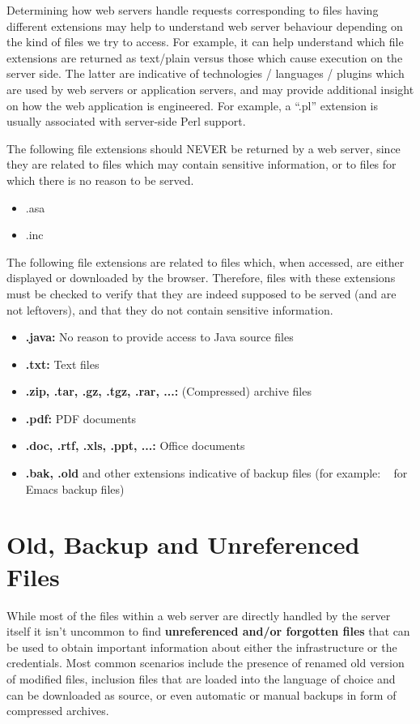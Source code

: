 	Determining how web servers handle requests corresponding to files having different extensions 
	may help to understand web server behaviour depending on the kind of files we try to access. 
	For example, it can help understand which file extensions are returned as text/plain versus 
	those which cause execution on the server side. The latter are indicative of technologies / 
	languages / plugins which are used by web servers or application servers, and may provide 
	additional insight on how the web application is engineered. For example, a “.pl” extension 
	is usually associated with server-side Perl support.

	The following file extensions should NEVER be returned by a web server, since they are related 
	to files which may contain sensitive information, or to files for which there is no reason to 
	be served.
		\begin{itemize}
			\item .asa
			\item .inc
		\end{itemize}

	The following file extensions are related to files which, when accessed, are either displayed 
	or downloaded by the browser. Therefore, files with these extensions must be checked to verify 
	that they are indeed supposed to be served (and are not leftovers), and that they do not contain
	sensitive information.
		\begin{itemize}
			\item {\bf .java:} No reason to provide access to Java source files
			\item {\bf .txt:} Text files
			\item {\bf .zip, .tar, .gz, .tgz, .rar, ...:} (Compressed) archive files
			\item {\bf .pdf:} PDF documents
			\item {\bf .doc, .rtf, .xls, .ppt, ...:} Office documents
			\item {\bf .bak, .old} and other extensions indicative of backup files 
			(for example: ~ for Emacs backup files)
		\end{itemize}

\section{Old, Backup and Unreferenced Files}

	While most of the files within a web server are directly handled by the server itself it 
	isn't uncommon to find {\bf unreferenced and/or forgotten files} that can be used to obtain 
	important information about either the infrastructure or the credentials. Most common 
	scenarios include the presence of renamed old version of modified files, inclusion files 
	that are loaded into the language of choice and can be downloaded as source, or even 
	automatic or manual backups in form of compressed archives.

